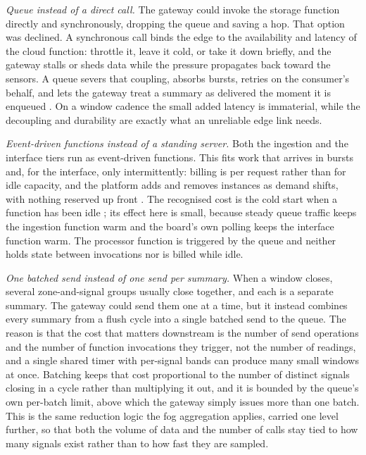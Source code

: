 \documentclass[conference]{IEEEtran}
\begin{document}
\textit{Queue instead of a direct call.} The gateway could invoke the storage function directly and synchronously, dropping the queue and saving a hop. That option was declined. A synchronous call binds the edge to the availability and latency of the cloud function: throttle it, leave it cold, or take it down briefly, and the gateway stalls or sheds data while the pressure propagates back toward the sensors. A queue severs that coupling, absorbs bursts, retries on the consumer's behalf, and lets the gateway treat a summary as delivered the moment it is enqueued \cite{hohpe2003}. On a window cadence the small added latency is immaterial, while the decoupling and durability are exactly what an unreliable edge link needs.

\textit{Event-driven functions instead of a standing server.} Both the ingestion and the interface tiers run as event-driven functions. This fits work that arrives in bursts and, for the interface, only intermittently: billing is per request rather than for idle capacity, and the platform adds and removes instances as demand shifts, with nothing reserved up front \cite{armbrust2010}. The recognised cost is the cold start when a function has been idle \cite{wang2018}; its effect here is small, because steady queue traffic keeps the ingestion function warm and the board's own polling keeps the interface function warm. The processor function is triggered by the queue and neither holds state between invocations nor is billed while idle.

\textit{One batched send instead of one send per summary.} When a window closes, several zone-and-signal groups usually close together, and each is a separate summary. The gateway could send them one at a time, but it instead combines every summary from a flush cycle into a single batched send to the queue. The reason is that the cost that matters downstream is the number of send operations and the number of function invocations they trigger, not the number of readings, and a single shared timer with per-signal bands can produce many small windows at once. Batching keeps that cost proportional to the number of distinct signals closing in a cycle rather than multiplying it out, and it is bounded by the queue's own per-batch limit, above which the gateway simply issues more than one batch. This is the same reduction logic the fog aggregation applies, carried one level further, so that both the volume of data and the number of calls stay tied to how many signals exist rather than to how fast they are sampled.
\end{document}

